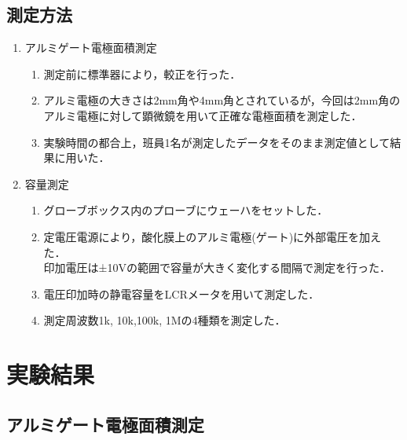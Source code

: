 \documentclass[11pt]{jarticle}
\begin{document}
		\subsection{測定方法}
			\begin{enumerate}
				\item アルミゲート電極面積測定\\
					\begin{enumerate}
						\item 測定前に標準器により，較正を行った．
						\item アルミ電極の大きさは2mm角や4mm角とされているが，今回は2mm角のアルミ電極に対して顕微鏡を用いて正確な電極面積を測定した．
						\item 実験時間の都合上，班員1名が測定したデータをそのまま測定値として結果に用いた．
					\end{enumerate}
				\item 容量測定\\
					\begin{enumerate}
						\item グローブボックス内のプローブにウェーハをセットした．
						\item 定電圧電源により，酸化膜上のアルミ電極(ゲート)に外部電圧を加えた．\\印加電圧は±10Vの範囲で容量が大きく変化する間隔で測定を行った．
						\item 電圧印加時の静電容量をLCRメータを用いて測定した．
						\item 測定周波数1k, 10k,100k, 1Mの4種類を測定した．
					\end{enumerate}
			\end{enumerate}

	\section{実験結果}
		\subsection{アルミゲート電極面積測定}
			
\end{document}
